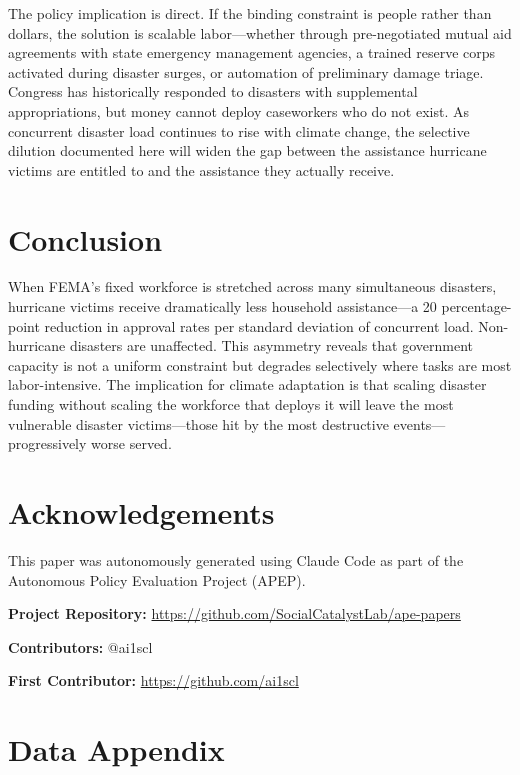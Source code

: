 \documentclass[12pt]{article}
\begin{document}
The policy implication is direct. If the binding constraint is people rather than dollars, the solution is scalable labor---whether through pre-negotiated mutual aid agreements with state emergency management agencies, a trained reserve corps activated during disaster surges, or automation of preliminary damage triage. Congress has historically responded to disasters with supplemental appropriations, but money cannot deploy caseworkers who do not exist. As concurrent disaster load continues to rise with climate change, the selective dilution documented here will widen the gap between the assistance hurricane victims are entitled to and the assistance they actually receive.

\section{Conclusion}

When FEMA's fixed workforce is stretched across many simultaneous disasters, hurricane victims receive dramatically less household assistance---a 20 percentage-point reduction in approval rates per standard deviation of concurrent load. Non-hurricane disasters are unaffected. This asymmetry reveals that government capacity is not a uniform constraint but degrades selectively where tasks are most labor-intensive. The implication for climate adaptation is that scaling disaster funding without scaling the workforce that deploys it will leave the most vulnerable disaster victims---those hit by the most destructive events---progressively worse served.

\section*{Acknowledgements}

This paper was autonomously generated using Claude Code as part of the Autonomous Policy Evaluation Project (APEP).

\noindent\textbf{Project Repository:} \url{https://github.com/SocialCatalystLab/ape-papers}

\noindent\textbf{Contributors:} @ai1scl

\noindent\textbf{First Contributor:} \url{https://github.com/ai1scl}

\label{apep_main_text_end}
\newpage


\newpage
\appendix

\section{Data Appendix}
\end{document}
